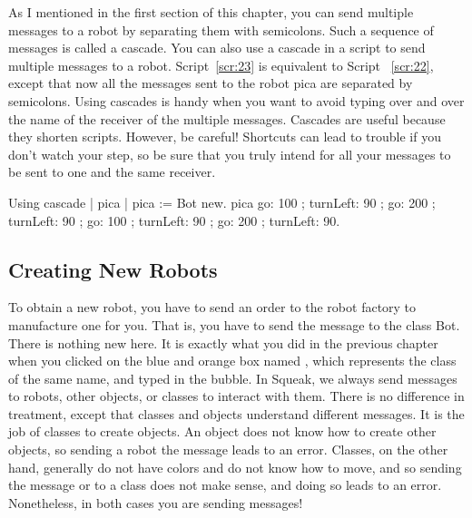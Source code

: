 \documentclass[a4paper,10pt,twoside]{book}
\begin{document}
As I mentioned in the first section of this chapter, you can send multiple messages to a robot by 
separating them with semicolons. Such a sequence of messages is called a cascade. You can also 
use a cascade in a script to send multiple messages to a robot. Script~\ref{scr:23} is equivalent to Script 
~\ref{scr:22}, except that now all the messages sent to the robot pica are separated by semicolons. Using 
cascades is handy when you want to avoid typing over and over the name of the receiver of 
the multiple messages. Cascades are useful because they shorten scripts. However, be careful! 
Shortcuts can lead to trouble if you don’t watch your step, so be sure that you truly intend for all 
your messages to be sent to one and the same receiver. 

\begin{script}[23]{Using cascade}
| pica | 
pica := Bot new. 
pica 
   go: 100 ; turnLeft: 90 ; go: 200 ; turnLeft: 90 ; 
   go: 100 ; turnLeft: 90 ; go: 200 ; turnLeft: 90. 
\end{script}


\subsection{Creating New Robots}
To obtain a new robot, you have to send an order to the robot factory to manufacture one for 
you. That is, you have to send the message  to the class Bot. There is nothing new here. It 
is exactly what you did in the previous chapter when you clicked on the blue and orange box 
named , which represents the class of the same name, and typed  in the bubble. In 
Squeak, we always send messages to robots, other objects, or classes to interact with them. 
There is no difference in treatment, except that classes and objects understand different 
messages. It is the job of classes to create objects. An object does not know how to create other 
objects, so sending a robot the message  leads to an error. Classes, on the other hand, 
generally do not have colors and do not know how to move, and so sending the message  or 
 to a class does not make sense, and doing so leads to an error. Nonetheless, in both 
cases you are sending messages! 
\end{document}
